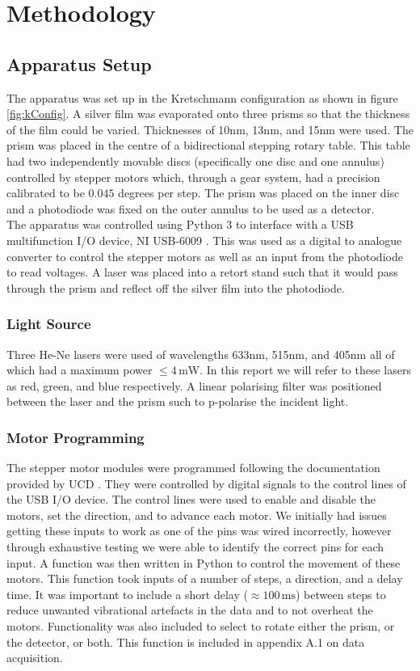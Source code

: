 \documentclass[%
reprint,
amsmath,amssymb,
aps,
]{revtex4-2}
\begin{document}
	\section{Methodology}
		\subsection{Apparatus Setup}
			The apparatus was set up in the Kretschmann configuration as shown in figure \ref{fig:kConfig}. A silver film was evaporated onto three prisms so that the thickness of the film could be varied. Thicknesses of 10nm, 13nm, and 15nm were used. The prism was placed in the centre of a bidirectional stepping rotary table. This table had two independently movable discs (specifically one disc and one annulus) controlled by stepper motors which, through a gear system, had a precision calibrated to be $0.045$ degrees per step. The prism was placed on the inner disc and a photodiode was fixed on the outer annulus to be used as a detector.\\
			
			The apparatus was controlled using Python 3 to interface with a USB multifunction I/O device, NI USB-6009 \cite{nationalInstruments}. This was used as a digital to analogue converter to control the stepper motors as well as an input from the photodiode to read voltages. A laser was placed into a retort stand such that it would pass through the prism and reflect off the silver film into the photodiode.

			\subsubsection{Light Source}
				Three He-Ne lasers were used of wavelengths 633nm, 515nm, and 405nm all of which had a maximum power $\le 4 \,\text{mW}$. In this report we will refer to these lasers as red, green, and blue respectively. A linear polarising filter was positioned between the laser and the prism such to p-polarise the incident light.
			
			\subsubsection{Motor Programming}
				The stepper motor modules were programmed following the documentation provided by UCD \cite{motorDoc}. They were controlled by digital signals to the control lines of the USB I/O device. The control lines were used to enable and disable the motors, set the direction, and to advance each motor. We initially had issues getting these inputs to work as one of the pins was wired incorrectly, however through exhaustive testing we were able to identify the correct pins for each input. A function was then written in Python to control the movement of these motors. This function took inputs of a number of steps, a direction, and a delay time. It was important to include a short delay ($\approx 100\,\text{ms}$) between steps to reduce unwanted vibrational artefacts in the data and to not overheat the motors. Functionality was also included to select to rotate either the prism, or the detector, or both. This function is included in appendix A.1 on data acquisition.
			
\end{document}
